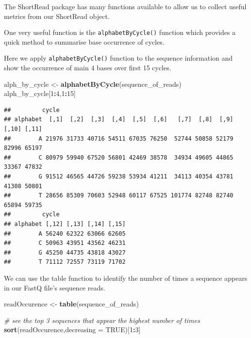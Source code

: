 \documentclass[
]{book}
\newenvironment{Shaded}{\begin{snugshade}}{\end{snugshade}}
\newcommand{\AttributeTok}[1]{\textcolor[rgb]{0.13,0.29,0.53}{#1}}
\newcommand{\CommentTok}[1]{\textcolor[rgb]{0.56,0.35,0.01}{\textit{#1}}}
\newcommand{\ConstantTok}[1]{\textcolor[rgb]{0.56,0.35,0.01}{#1}}
\newcommand{\DecValTok}[1]{\textcolor[rgb]{0.00,0.00,0.81}{#1}}
\newcommand{\FunctionTok}[1]{\textcolor[rgb]{0.13,0.29,0.53}{\textbf{#1}}}
\newcommand{\NormalTok}[1]{#1}
\newcommand{\OtherTok}[1]{\textcolor[rgb]{0.56,0.35,0.01}{#1}}
\newcommand{\SpecialCharTok}[1]{\textcolor[rgb]{0.81,0.36,0.00}{\textbf{#1}}}
\begin{document}
The ShortRead package has many functions available to allow us to collect useful metrics from our ShortRead object.

One very useful function is the \texttt{alphabetByCycle()} function which provides a quick method to summarise base occurrence of cycles.

Here we apply \texttt{alphabetByCycle()} function to the sequence information and show the occurrence of main 4 bases over first 15 cycles.

\begin{Shaded}
\begin{Highlighting}[]
\NormalTok{alph\_by\_cycle }\OtherTok{\textless{}{-}} \FunctionTok{alphabetByCycle}\NormalTok{(sequence\_of\_reads)}
\NormalTok{alph\_by\_cycle[}\DecValTok{1}\SpecialCharTok{:}\DecValTok{4}\NormalTok{,}\DecValTok{1}\SpecialCharTok{:}\DecValTok{15}\NormalTok{]}
\end{Highlighting}
\end{Shaded}

\begin{verbatim}
##         cycle
## alphabet  [,1]  [,2]  [,3]  [,4]  [,5]  [,6]   [,7]  [,8]  [,9] [,10] [,11]
##        A 21976 31733 40716 54511 67035 76250  52744 50858 52179 82996 65197
##        C 80979 59940 67520 56801 42469 38578  34934 49605 44865 33367 47832
##        G 91512 46565 44726 59238 53934 41211  34113 40354 43781 41308 50801
##        T 28656 85309 70603 52948 60117 67525 101774 82748 82740 65894 59735
##         cycle
## alphabet [,12] [,13] [,14] [,15]
##        A 56240 62322 63066 62605
##        C 50963 43951 43562 46231
##        G 45250 44735 43818 43027
##        T 71112 72557 73119 71702
\end{verbatim}

We can use the table function to identify the number of times a sequence appears in our FastQ file's sequence reads.

\begin{Shaded}
\begin{Highlighting}[]
\NormalTok{readOccurence }\OtherTok{\textless{}{-}} \FunctionTok{table}\NormalTok{(sequence\_of\_reads)}

\CommentTok{\# see the top 3 sequences that appear the highest number of times}
\FunctionTok{sort}\NormalTok{(readOccurence,}\AttributeTok{decreasing =} \ConstantTok{TRUE}\NormalTok{)[}\DecValTok{1}\SpecialCharTok{:}\DecValTok{3}\NormalTok{]}
\end{Highlighting}
\end{Shaded}
\end{document}
